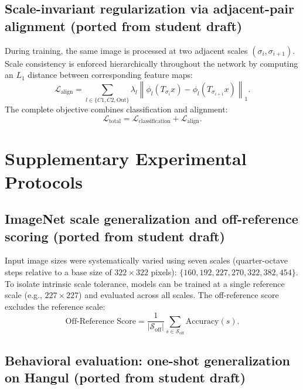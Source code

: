 \documentclass[pdflatex,sn-nature]{sn-jnl}
\begin{document}
\subsection{Scale-invariant regularization via adjacent-pair alignment (ported from student draft)}

During training, the same image is processed at two adjacent scales $(\sigma_i, \sigma_{i+1})$.
Scale consistency is enforced hierarchically throughout the network by computing an $L_1$ distance
between corresponding feature maps:
\begin{equation}
 \mathcal{L}_{\text{align}} = \sum_{l \in \{C1, C2, \text{Out}\}} \lambda_l
 \left\| \phi_l(T_{\sigma_i}x) - \phi_l(T_{\sigma_{i+1}}x) \right\|_1.
\label{eq:hierarchical-align}
\end{equation}
The complete objective combines classification and alignment:
\begin{equation}
\mathcal{L}_{\text{total}} = \mathcal{L}_{\text{classification}} + \mathcal{L}_{\text{align}}.
\label{eq:total-loss}
\end{equation}

\section{Supplementary Experimental Protocols}

\subsection{ImageNet scale generalization and off-reference scoring (ported from student draft)}

Input image sizes were systematically varied using seven scales (quarter-octave steps relative to a
base size of $322 \times 322$ pixels): $\{160, 192, 227, 270, 322, 382, 454\}$. To isolate intrinsic
scale tolerance, models can be trained at a single reference scale (e.g., $227\times227$) and
evaluated across all scales. The off-reference score excludes the reference scale:
\begin{equation}
\text{Off-Reference Score} =
\frac{1}{|\mathcal{S}_{\text{off}}|}\sum_{s \in \mathcal{S}_{\text{off}}}\text{Accuracy}(s).
\label{eq:offref}
\end{equation}

\subsection{Behavioral evaluation: one-shot generalization on Hangul (ported from student draft)}
\end{document}
